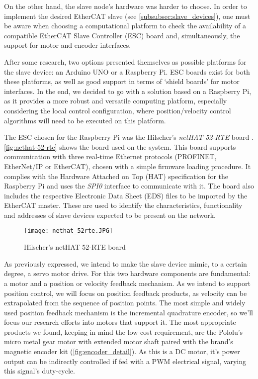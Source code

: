 On the other hand, the slave node's hardware was harder to choose.
In order to implement the desired EtherCAT slave (see \autoref{subsubsec:slave_devices}), one must be aware when choosing a computational platform to check the availability of a compatible EtherCAT Slave Controller (ESC) board and, simultaneously, the support for motor and encoder interfaces.

After some research, two options presented themselves as possible platforms for the slave device: an Arduino UNO or a Raspberry Pi.
ESC boards exist for both these platforms, as well as good support in terms of `shield boards' for motor interfaces.
In the end, we decided to go with a solution based on a Raspberry Pi, as it provides a more robust and versatile computing platform, especially considering the local control configuration, where position/velocity control algorithms will need to be executed on this platform.

The ESC chosen for the Raspberry Pi was the Hilscher's \emph{netHAT 52-RTE} board \cite{hdw:nethat-52rte}.
\autoref{fig:nethat-52-rte} shows the board used on the system.
This board supports communication with three real-time Ethernet protocols (PROFINET, EtherNet/IP or EtherCAT), chosen with a simple firmware loading procedure.
It complies with the Hardware Attached on Top (HAT) specification for the Raspberry Pi \cite{technology:hats} and uses the \emph{SPI0} interface to communicate with it.
The board also includes the respective Electronic Data Sheet (EDS) files to be imported by the EtherCAT master.
These are used to identify the characteristics, functionality and addresses of slave devices expected to be present on the network.

\begin{figure}[htp]
	\centering
	\texttt{[image: nethat\_52rte.JPG]}
	\caption{Hilscher's netHAT 52-RTE board}
	\label{fig:nethat-52-rte}
\end{figure}

As previously expressed, we intend to make the slave device mimic, to a certain degree, a servo motor drive.
For this two hardware components are fundamental: a motor and a position or velocity feedback mechanism.
As we intend to support position control, we will focus on position feedback products, as velocity can be extrapolated from the sequence of position points.
The most simple and widely used position feedback mechanism is the incremental quadrature encoder, so we'll focus our research efforts into motors that support it.
The most appropriate products we found, keeping in mind the low-cost requirement, are the Pololu's micro metal gear motor with extended motor shaft \cite{product:pololu-micrometal-gearmotor} paired with the brand's magnetic encoder kit \cite{product:pololu-encoder-kit} (\autoref{fig:encoder_detail}).
As this is a DC motor, it's power output can be indirectly controlled if fed with a PWM electrical signal, varying this signal's duty-cycle. %

